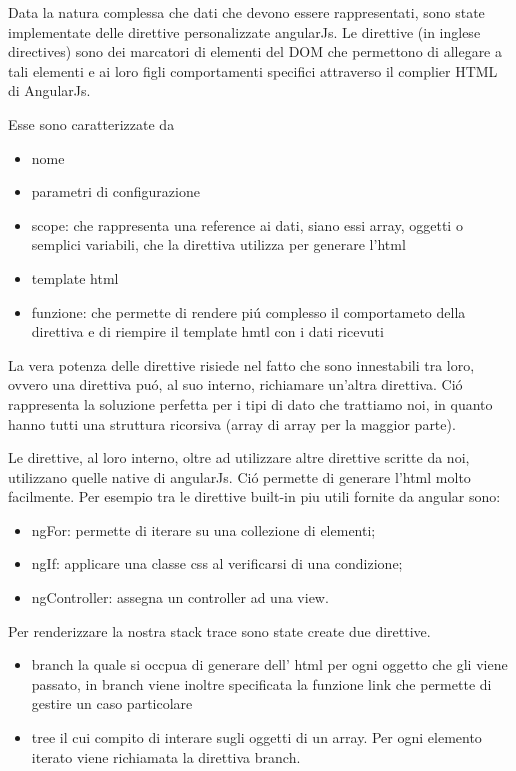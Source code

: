 Data la natura complessa che dati che devono essere rappresentati, sono state
implementate delle direttive personalizzate angularJs.
Le direttive (in inglese directives) sono dei marcatori di elementi del DOM che permettono di allegare
a tali elementi e ai loro figli comportamenti specifici attraverso il complier
HTML di AngularJs.

Esse sono  caratterizzate da
	\begin{itemize}
		\item nome
		\item parametri di configurazione
		\item scope:  che rappresenta una reference ai dati, siano essi array, oggetti o
				semplici variabili, che la direttiva utilizza per generare l'html
		\item template html
		\item funzione: che permette di rendere piú complesso il comportameto della direttiva
					e di riempire il template hmtl con i dati ricevuti
	\end{itemize}

La vera potenza delle direttive risiede nel fatto che sono innestabili tra loro,
ovvero una direttiva puó, al suo interno, richiamare un'altra direttiva. Ció
rappresenta la soluzione perfetta per i tipi di dato che trattiamo noi, in quanto
hanno tutti una struttura ricorsiva (array di array per la maggior parte).

Le direttive, al loro interno, oltre ad utilizzare altre direttive scritte da noi,
utilizzano quelle native di angularJs. Ció permette di generare l'html molto
facilmente. Per esempio tra le direttive built-in piu utili fornite da angular sono:
\begin{itemize}
	\item ngFor: permette di iterare su una collezione di elementi;
	\item ngIf: applicare una classe css al verificarsi di una condizione;
	\item ngController: assegna un controller ad una view.
\end{itemize}

Per renderizzare la nostra stack trace sono state create due direttive.
\begin{itemize}
	\item branch la quale si occpua di generare dell' html per ogni oggetto che gli viene passato,
  		in branch viene inoltre specificata la funzione link che permette di gestire un caso particolare
 	\item tree il cui compito di interare sugli oggetti di un array. Per ogni elemento iterato viene richiamata
  		la direttiva branch.
\end{itemize}

